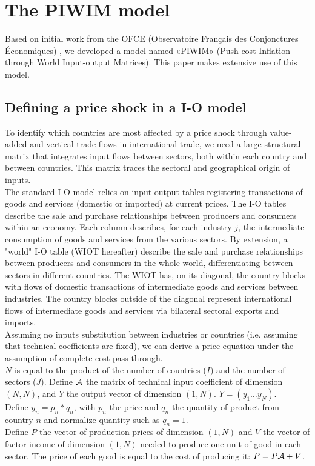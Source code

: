 \documentclass[11pt,a4paper]{article}
\begin{document}
\section{The PIWIM model }
\label{sec:metho}
Based on initial work from the OFCE (Observatoire Français des Conjonctures Économiques) \cite{Cochard2016}, we developed a model named «PIWIM» (Push cost Inflation through World Input-output Matrices). This paper makes extensive use of this model.


\subsection{Defining a price shock in a I-O model}
\label{subsec:ioprice}
To identify which countries are most affected by a price shock through value-added and vertical trade flows in international trade, we need a large structural matrix that integrates input flows between sectors, both within each country and between countries.
This matrix traces the sectoral and geographical origin of inputs. \\
The standard I-O model relies on input-output tables registering transactions of goods and services (domestic or imported) at current prices. The I-O tables describe the sale and purchase relationships between producers and consumers within an economy. Each column describes, for each industry $j$, the intermediate consumption of goods and services from the various sectors.
By extension, a "world" I-O table (WIOT hereafter) describe the sale and purchase relationships between producers and consumers in the whole world, differentiating between sectors in different countries.
The WIOT has, on its diagonal, the country blocks with flows of domestic transactions of intermediate goods and services between industries.
The country blocks outside of the diagonal represent international flows of intermediate goods and services via bilateral sectoral exports and imports. \\
Assuming no inputs substitution between industries or countries (i.e. assuming that technical coefficients are fixed), we can derive a price equation under the assumption of complete cost pass-through.\\
$N$ is equal to the product of the number of countries ($I$) and the number of sectors ($J$). Define $\cal A$ the matrix of technical input coefficient of dimension $(N, N)$, and $Y$ the output vector of dimension $(1, N)$. $Y=(y_1\ldots y_N)$.  \\
Define $y_n=p_n*q_n$, with $p_n$ the price and $q_n$ the quantity of product from country $n$ and normalize quantity such as $q_n=1$. \\
Define $P$ the vector of production prices of dimension $(1, N)$ and $V$ the vector of factor income of dimension $(1, N)$ needed to produce one unit of good in each sector. The price of each good is equal to the cost of producing it: $P=P{\cal A}+V$. \\
\end{document}
